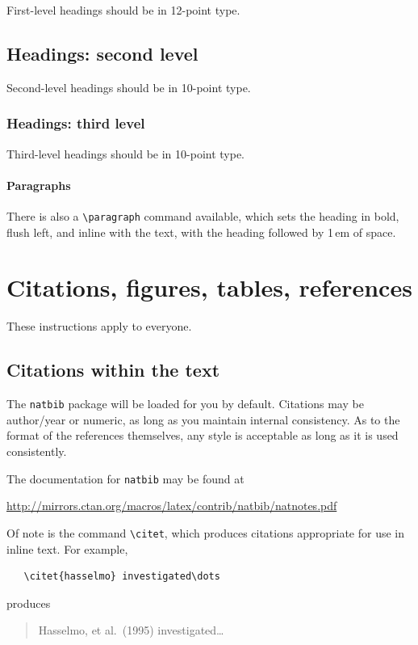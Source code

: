 \documentclass{article}
\begin{document}
\begin{CJK}{UTF8}{gbsn}
First-level headings should be in 12-point type.


\subsection{Headings: second level}


Second-level headings should be in 10-point type.


\subsubsection{Headings: third level}


Third-level headings should be in 10-point type.


\paragraph{Paragraphs}


There is also a \verb+\paragraph+ command available, which sets the heading in
bold, flush left, and inline with the text, with the heading followed by 1\,em
of space.


\section{Citations, figures, tables, references}
\label{others}


These instructions apply to everyone.


\subsection{Citations within the text}


The \verb+natbib+ package will be loaded for you by default.  Citations may be
author/year or numeric, as long as you maintain internal consistency.  As to the
format of the references themselves, any style is acceptable as long as it is
used consistently.


The documentation for \verb+natbib+ may be found at
\begin{center}
  \url{http://mirrors.ctan.org/macros/latex/contrib/natbib/natnotes.pdf}
\end{center}
Of note is the command \verb+\citet+, which produces citations appropriate for
use in inline text.  For example,
\begin{verbatim}
   \citet{hasselmo} investigated\dots
\end{verbatim}
produces
\begin{quote}
  Hasselmo, et al.\ (1995) investigated\dots
\end{quote}



\end{CJK}
\end{document}
